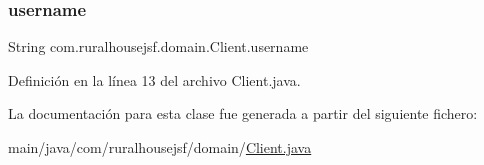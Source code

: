 \subsubsection{\texorpdfstring{username}{username}}
{\footnotesize\ttfamily String com.\+ruralhousejsf.\+domain.\+Client.\+username\hspace{0.3cm}{\ttfamily [private]}}



Definición en la línea 13 del archivo Client.\+java.



La documentación para esta clase fue generada a partir del siguiente fichero\+:\begin{DoxyCompactItemize}
\item 
main/java/com/ruralhousejsf/domain/\mbox{\hyperlink{a00029}{Client.\+java}}\end{DoxyCompactItemize}
